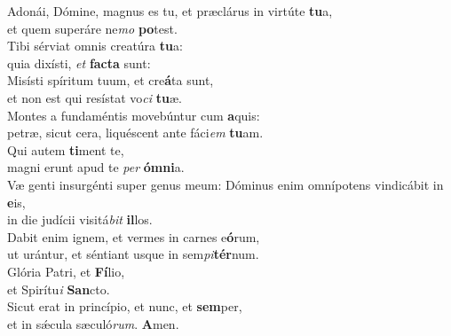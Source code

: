 \evenverse Adonái, Dómine, magnus es tu, et præclárus in virtúte \textbf{tu}a,~\*\\
\evenverse et quem superáre ne\textit{mo} \textbf{po}test.\\
\oddverse Tibi sérviat omnis creatúra \textbf{tu}a:~\*\\
\oddverse quia dixísti, \textit{et} \textbf{fa}\textbf{cta} sunt:\\
\evenverse Misísti spíritum tuum, et cre\textbf{á}ta sunt,~\*\\
\evenverse et non est qui resístat vo\textit{ci} \textbf{tu}æ.\\
\oddverse Montes a fundaméntis movebúntur cum \textbf{a}quis:~\*\\
\oddverse petræ, sicut cera, liquéscent ante fáci\textit{em} \textbf{tu}am.\\
\evenverse Qui autem \textbf{ti}ment te,~\*\\
\evenverse magni erunt apud te \textit{per} \textbf{óm}\textbf{ni}a.\\
\oddverse Væ genti insurgénti super genus meum: Dóminus enim omnípotens vindicábit in \textbf{e}is,~\*\\
\oddverse in die judícii visitá\textit{bit} \textbf{il}los.\\
\evenverse Dabit enim ignem, et vermes in carnes e\textbf{ó}rum,~\*\\
\evenverse ut urántur, et séntiant usque in sem\textit{pi}\textbf{tér}num.\\
\oddverse Glória Patri, et \textbf{Fí}lio,~\*\\
\oddverse et Spirítu\textit{i} \textbf{San}cto.\\
\evenverse Sicut erat in princípio, et nunc, et \textbf{sem}per,~\*\\
\evenverse et in sǽcula sæculó\textit{rum}. \textbf{A}men.\\

